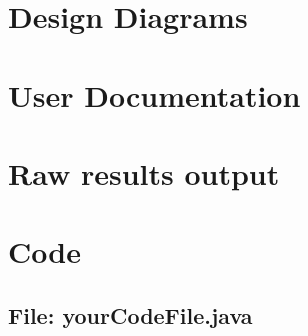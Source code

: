 \documentclass[11pt,openright,a4paper]{report}
\begin{document}
\appendix


\chapter{Design Diagrams}

\chapter{User Documentation}

\chapter{Raw results output}

\chapter{Code}


\begin{landscape}
\begin{multicols}{2}
\section{File: yourCodeFile.java}

\end{multicols}
\end{landscape}
\end{document}

